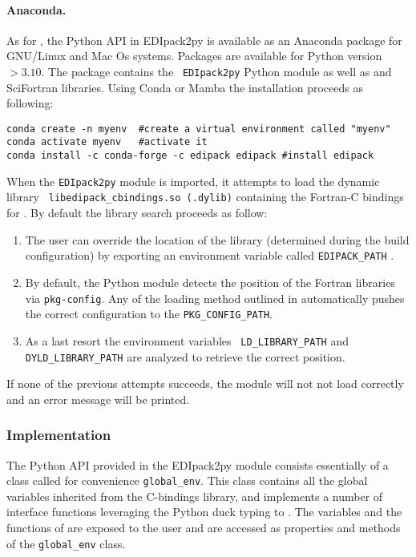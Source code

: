 \documentclass[edipack_sp.tex]{subfiles}
\begin{document}
\paragraph{Anaconda.}
As for \NAME, the Python API in EDIpack2py is available as an
Anaconda package for GNU/Linux and Mac Os systems. Packages are available for
Python version $>3.10$. The \NAME package contains the {\tt
  EDIpack2py} Python module as well as \NAME and SciFortran
libraries. 
Using Conda or Mamba the installation proceeds as following:
\begin{lstlisting}[style=mybash]
conda create -n myenv  #create a virtual environment called "myenv"
conda activate myenv   #activate it
conda install -c conda-forge -c edipack edipack #install edipack
\end{lstlisting}

\noindent
When the {\tt EDIpack2py}    module is imported, it attempts to load the dynamic library {\tt
  libedipack\-\_cbindings.so (.dylib)} containing the Fortran-C bindings
for \NAME. By default the library search proceeds as follow: 
\begin{enumerate}
\item The user can override the location of the library
  (determined during the \NAME build configuration) by exporting an
  environment variable called {\tt EDIPACK\_PATH} .
\item By default, the Python module detects the position of the
  Fortran libraries via {\tt pkg-config}. Any of the loading method
  outlined in  automatically pushes the
  correct configuration to the {\tt PKG\_CONFIG\_PATH}. 
\item As a last resort the environment variables {\tt
    LD\_LIBRARY\_PATH} and {\tt DYLD\_LIBRARY\_PATH} are analyzed to
  retrieve the correct position. 
\end{enumerate}
If none of the previous attempts succeeds, the module will not not load correctly and an error message will be printed. 



\subsubsection{Implementation}\label{sSecInteropEDIpyImplementation}
The Python API provided in the EDIpack2py module consists essentially of a
class called for convenience {\tt global\_env}.
This class contains all the global variables inherited from the \NAME
C-bindings library, and implements a number of interface functions
leveraging the Python duck typing to \NAME.  
The variables and the functions of \NAME are exposed to the user and
are accessed as properties and
methods of the {\tt global\_env} class.
\end{document}
